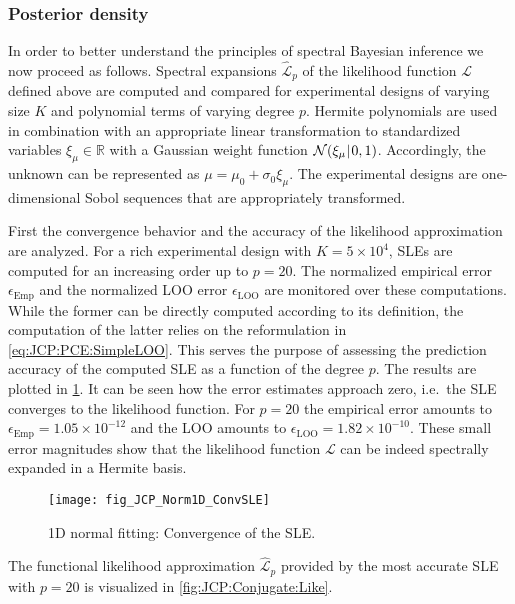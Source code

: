 \subsubsection{Posterior density}
In order to better understand the principles of spectral Bayesian inference we now proceed as follows.
Spectral expansions \(\hat{\mathcal{L}}_p\) of the likelihood function \(\mathcal{L}\) defined above are computed and compared
for experimental designs of varying size \(K\) and polynomial terms of varying degree \(p\).
Hermite polynomials are used in combination with an appropriate linear transformation to standardized variables
\(\xi_\mu \in \mathds{R}\) with a Gaussian weight function \(\mathcal{N}(\xi_\mu {\:\!}|{\:\!} 0,1)\).
Accordingly, the unknown can be represented as \(\mu = \mu_0 + \sigma_0 \xi_\mu\).
The experimental designs are one-dimensional Sobol sequences that are appropriately transformed.
\par %
First the convergence behavior and the accuracy of the likelihood approximation are analyzed.
For a rich experimental design with \(K = 5 \times 10^4\), SLEs are computed for an increasing order up to \(p = 20\).
The normalized empirical error \(\epsilon_{\mathrm{Emp}}\) and the normalized LOO error \(\epsilon_{\mathrm{LOO}}\) are monitored over these computations.
While the former can be directly computed according to its definition, the computation of the latter relies on the reformulation in \cref{eq:JCP:PCE:SimpleLOO}.
This serves the purpose of assessing the prediction accuracy of the computed SLE as a function of the degree \(p\).
The results are plotted in \cref{fig:JCP:Conjugate:ConvSLE}.
It can be seen how the error estimates approach zero, i.e.\ the SLE converges to the likelihood function.
For \(p = 20\) the empirical error amounts to \(\epsilon_{\mathrm{Emp}} = 1.05 \times 10^{-12}\) and the LOO amounts to \(\epsilon_{\mathrm{LOO}} = 1.82 \times 10^{-10}\).
These small error magnitudes show that the likelihood function \(\mathcal{L}\) can be indeed spectrally expanded in a Hermite basis.
\begin{figure}[htbp]
  \centering
  \texttt{[image: fig\_JCP\_Norm1D\_ConvSLE]}
  \caption[1D normal fitting: Convergence of the SLE]{1D normal fitting: Convergence of the SLE.}
  \label{fig:JCP:Conjugate:ConvSLE}
\end{figure}
\par %
The functional likelihood approximation \(\hat{\mathcal{L}}_p\) provided by the most accurate SLE with \(p = 20\) is visualized in \cref{fig:JCP:Conjugate:Like}.
